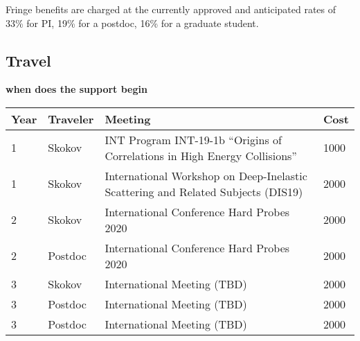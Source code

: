 \documentclass{DOEproposal}
\newcommand{\TODO}{\color{red} \bf}
\begin{document}
		\noindent 	
		Fringe benefits are charged at the currently approved and anticipated rates of 33\%
		for PI, 19\% for a postdoc, 
		16\% for a graduate student.%
		\vspace{1.2em}			

		\subsection*{Travel} 

		\vspace{0.5em}			
		
		{\TODO {when does the support begin} } \\ 
		\begin{center}
{%
\begin{tabular}{|l|l|p{90mm}|l| }
\hline
Year &  Traveler \hspace{0.5cm}  &  Meeting  & Cost   \\
\hline
1 &  Skokov  &  INT Program INT-19-1b
``Origins of Correlations in High Energy Collisions'' & 1000   \\
\hline
1  & Skokov  & International Workshop on Deep-Inelastic Scattering and Related Subjects (DIS19)   & 2000   \\ \hline
2  & Skokov  & International Conference Hard Probes 2020  &  2000   \\ \hline
2  & Postdoc  & 
 International Conference Hard Probes 2020 
 &  2000  \\ \hline
3  & Skokov  & International Meeting (TBD) &  2000  \\ \hline
3 & Postdoc &  International Meeting (TBD) &  2000\\ \hline
3 & Postdoc  & International Meeting (TBD) &  2000 \\ \hline
\end{tabular}
}
\end{center}
			
				
\end{document}
